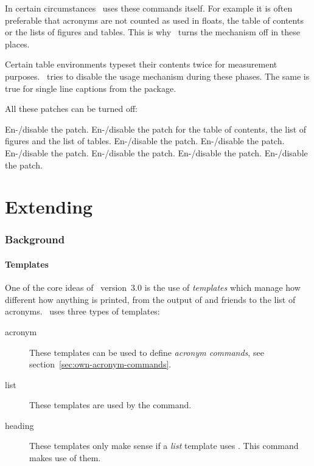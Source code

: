 \documentclass{acro-manual}
\begin{document}
In certain circumstances \acro\ uses these commands itself. For example it is
often preferable that acronyms are not counted as used in floats, the table of
contents or the lists of figures and tables.  This is why \acro\ turns the
mechanism off in these places.

Certain table environments typeset their contents twice for measurement
purposes.  \acro\ tries to disable the usage mechanism during these phases.
The same is true for single line captions from the  package.

All these patches can be turned off:
\begin{options}
    En-/disable the  patch.
    En-/disable the  patch for the table of contents, the list
    of figures and the list of tables.
    En-/disable the  patch.
    En-/disable the  patch.
    En-/disable the  patch.
    En-/disable the  patch.
    En-/disable the  patch.
    En-/disable the  patch.
\end{options}

\part{Extending \acro}\label{part:extending-acro}
\section{Background}\label{sec:background}
\subsection{Templates}
One of the core ideas of \acro\ version~3.0 is the use of \emph{templates}
which manage how different how anything is printed, from the output of 
and friends to the list of acronyms.  \acro\ uses three types of templates:
\begin{description}
  \item[acronym] These templates can be used to define \emph{acronym
      commands}, see section~\vref{sec:own-acronym-commands}.
  \item[list] These templates are used by the  command.
  \item[heading]  These templates only make sense if a \emph{list} template
    uses .  This command makes use of them.
\end{description}
\end{document}
